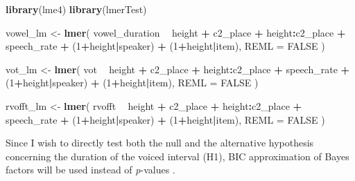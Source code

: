 \documentclass[11pt,]{article}
\newenvironment{Shaded}{\begin{snugshade}}{\end{snugshade}}
\newcommand{\DataTypeTok}[1]{\textcolor[rgb]{0.13,0.29,0.53}{#1}}
\newcommand{\DecValTok}[1]{\textcolor[rgb]{0.00,0.00,0.81}{#1}}
\newcommand{\KeywordTok}[1]{\textcolor[rgb]{0.13,0.29,0.53}{\textbf{#1}}}
\newcommand{\NormalTok}[1]{#1}
\newcommand{\OperatorTok}[1]{\textcolor[rgb]{0.81,0.36,0.00}{\textbf{#1}}}
\newcommand{\OtherTok}[1]{\textcolor[rgb]{0.56,0.35,0.01}{#1}}
\newcommand{\StringTok}[1]{\textcolor[rgb]{0.31,0.60,0.02}{#1}}
\begin{document}
\begin{Shaded}
\begin{Highlighting}[]
\KeywordTok{library}\NormalTok{(lme4)}
\KeywordTok{library}\NormalTok{(lmerTest)}

\NormalTok{vowel_lm <-}\StringTok{ }\KeywordTok{lmer}\NormalTok{(}
\NormalTok{  vowel_duration }\OperatorTok{~}
\StringTok{    }\NormalTok{height }\OperatorTok{+}
\StringTok{    }\NormalTok{c2_place }\OperatorTok{+}
\StringTok{    }\NormalTok{height}\OperatorTok{:}\NormalTok{c2_place }\OperatorTok{+}
\StringTok{    }\NormalTok{speech_rate }\OperatorTok{+}
\StringTok{    }\NormalTok{(}\DecValTok{1}\OperatorTok{+}\NormalTok{height}\OperatorTok{|}\NormalTok{speaker) }\OperatorTok{+}
\StringTok{    }\NormalTok{(}\DecValTok{1}\OperatorTok{+}\NormalTok{height}\OperatorTok{|}\NormalTok{item),}
  \DataTypeTok{REML =} \OtherTok{FALSE}
\NormalTok{)}

\NormalTok{vot_lm <-}\StringTok{ }\KeywordTok{lmer}\NormalTok{(}
\NormalTok{  vot }\OperatorTok{~}
\StringTok{    }\NormalTok{height }\OperatorTok{+}
\StringTok{    }\NormalTok{c2_place }\OperatorTok{+}
\StringTok{    }\NormalTok{height}\OperatorTok{:}\NormalTok{c2_place }\OperatorTok{+}
\StringTok{    }\NormalTok{speech_rate }\OperatorTok{+}
\StringTok{    }\NormalTok{(}\DecValTok{1}\OperatorTok{+}\NormalTok{height}\OperatorTok{|}\NormalTok{speaker) }\OperatorTok{+}
\StringTok{    }\NormalTok{(}\DecValTok{1}\OperatorTok{+}\NormalTok{height}\OperatorTok{|}\NormalTok{item),}
  \DataTypeTok{REML =} \OtherTok{FALSE}
\NormalTok{)}

\NormalTok{rvofft_lm <-}\StringTok{ }\KeywordTok{lmer}\NormalTok{(}
\NormalTok{  rvofft }\OperatorTok{~}
\StringTok{    }\NormalTok{height }\OperatorTok{+}
\StringTok{    }\NormalTok{c2_place }\OperatorTok{+}
\StringTok{    }\NormalTok{height}\OperatorTok{:}\NormalTok{c2_place }\OperatorTok{+}
\StringTok{    }\NormalTok{speech_rate }\OperatorTok{+}
\StringTok{    }\NormalTok{(}\DecValTok{1}\OperatorTok{+}\NormalTok{height}\OperatorTok{|}\NormalTok{speaker) }\OperatorTok{+}
\StringTok{    }\NormalTok{(}\DecValTok{1}\OperatorTok{+}\NormalTok{height}\OperatorTok{|}\NormalTok{item),}
  \DataTypeTok{REML =} \OtherTok{FALSE}
\NormalTok{)}
\end{Highlighting}
\end{Shaded}

Since I wish to directly test both the null and the alternative
hypothesis concerning the duration of the voiced interval (H1), BIC
approximation of Bayes factors will be used instead of \emph{p}-values
\citep{wagenmakers2007}.
\end{document}
